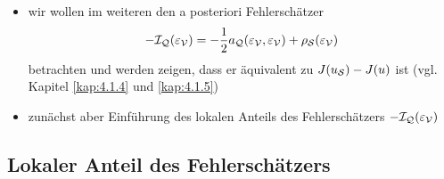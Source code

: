 \begin{itemize}
\item wir wollen im weiteren den a posteriori Fehlerschätzer
\[
	-\mathcal I_{\mathcal Q} (\varepsilon_{\mathcal V})= -\frac 1 2 a_{\mathcal Q}(\varepsilon_{\mathcal V},\varepsilon_{\mathcal V}) + \rho_{\mathcal S}(\varepsilon_{\mathcal V})
\]
betrachten und werden zeigen, dass er äquivalent zu $J(u_{\mathcal S}) - J(u)$ ist (vgl. Kapitel \ref{kap:4.1.4} und \ref{kap:4.1.5})

\item zunächst aber Einführung des lokalen Anteils des Fehlerschätzers $-\mathcal I_{\mathcal Q} (\varepsilon_{\mathcal V})$
\end{itemize}





\subsection{Lokaler Anteil des Fehlerschätzers}
\label{kap:4.1.2}

